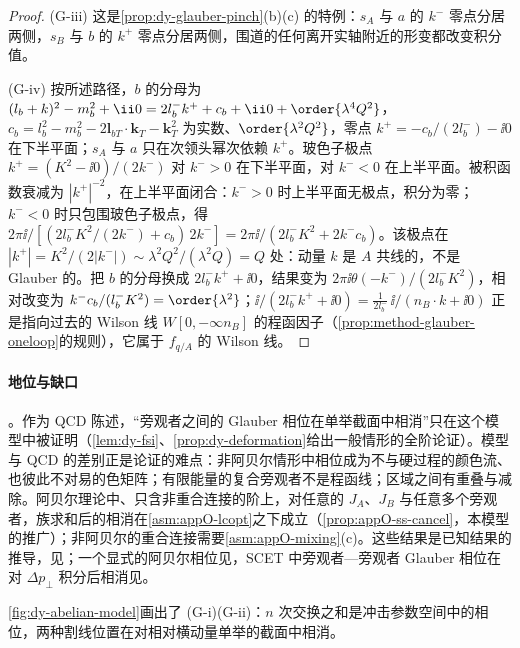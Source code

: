 \begin{proof}
(G-iii) 这是\cref{prop:dy-glauber-pinch}(b)(c) 的特例：$s_A$ 与 $a$ 的 $k^-$ 零点分居两侧，$s_B$ 与 $b$ 的 $k^+$ 零点分居两侧，围道的任何离开实轴附近的形变都改变积分值。

(G-iv) 按所述路径，$b$ 的分母为 $(l_b+k)^2-m_b^2+\ii0=2l_b^-k^++c_b+\ii0+\order{\lambda^4Q^2}$，$c_b=l_b^2-m_b^2-2\mathbf l_{bT}\cdot\mathbf k_T-\mathbf k_T^2$ 为实数、$\order{\lambda^2Q^2}$，零点 $k^+=-c_b/(2l_b^-)-\ii0$ 在下半平面；$s_A$ 与 $a$ 只在次领头幂次依赖 $k^+$。玻色子极点 $k^+=(K^2-\ii0)/(2k^-)$ 对 $k^->0$ 在下半平面，对 $k^-<0$ 在上半平面。被积函数衰减为 $|k^+|^{-2}$，在上半平面闭合：$k^->0$ 时上半平面无极点，积分为零；$k^-<0$ 时只包围玻色子极点，得 $2\pi\ii/[(2l_b^-K^2/(2k^-)+c_b)\,2k^-]=2\pi\ii/(2l_b^-K^2+2k^-c_b)$。该极点在 $|k^+|=K^2/(2|k^-|)\sim\lambda^2Q^2/(\lambda^2Q)=Q$ 处：动量 $k$ 是 $A$ 共线的，不是 Glauber 的。把 $b$ 的分母换成 $2l_b^-k^++\ii0$，结果变为 $2\pi\ii\theta(-k^-)/(2l_b^-K^2)$，相对改变为 $k^-c_b/(l_b^-K^2)=\order{\lambda^2}$；$\ii/(2l_b^-k^++\ii0)=\frac{1}{2l_b^-}\,\ii/(n_B\cdot k+\ii0)$ 正是指向过去的 Wilson 线 $W[0,-\infty n_B]$ 的程函因子（\cref{prop:method-glauber-oneloop}的规则），它属于 $f_{q/A}$ 的 Wilson 线。
\end{proof}

\paragraph{地位与缺口}\tagP。作为 QCD 陈述，“旁观者之间的 Glauber 相位在单举截面中相消”只在这个模型中被证明（\cref{lem:dy-fsi}、\cref{prop:dy-deformation}给出一般情形的全阶论证）。模型与 QCD 的差别正是论证的难点：非阿贝尔情形中相位成为不与硬过程的颜色流、也彼此不对易的色矩阵；有限能量的复合旁观者不是程函线；区域之间有重叠与减除。阿贝尔理论中、只含非重合连接的阶上，对任意的 $J_A$、$J_B$ 与任意多个旁观者，族求和后的相消在\cref{asm:appO-lcopt}之下成立（\cref{prop:appO-ss-cancel}，本模型的推广）；非阿贝尔的重合连接需要\cref{asm:appO-mixing}(c)。这些结果是已知结果的推导，见\cite[第~14.3~节，式~(14.11)--(14.16)，第~14.3.3--14.3.4~节]{Collins2011}；一个显式的阿贝尔相位见\cite[式~(14)]{AybatSterman2009}，SCET 中旁观者—旁观者 Glauber 相位在对 $\Delta p_\perp$ 积分后相消见\cite[式~(11.12)--(11.13)]{RothsteinStewart2016}。

\cref{fig:dy-abelian-model}画出了 (G-i)(G-ii)：$n$ 次交换之和是冲击参数空间中的相位，两种割线位置在对相对横动量单举的截面中相消。

